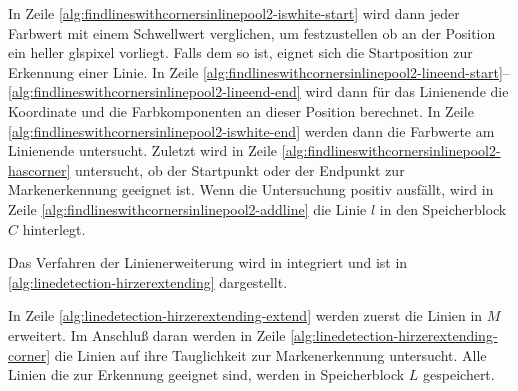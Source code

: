 In Zeile \ref{alg:findlineswithcornersinlinepool2-iswhite-start} wird dann jeder Farbwert mit einem Schwellwert
 verglichen, um festzustellen ob an der Position ein heller gls{pixel} vorliegt. Falls dem so ist, eignet sich die
 Startposition zur Erkennung einer Linie. In Zeile
 \ref{alg:findlineswithcornersinlinepool2-lineend-start}--\ref{alg:findlineswithcornersinlinepool2-lineend-end} wird
 dann für das Linienende die Koordinate und die Farbkomponenten an dieser Position berechnet. In Zeile
 \ref{alg:findlineswithcornersinlinepool2-iswhite-end} werden dann die Farbwerte am Linienende untersucht. Zuletzt wird
 in Zeile \ref{alg:findlineswithcornersinlinepool2-hascorner} untersucht, ob der Startpunkt oder der Endpunkt zur
 Markenerkennung geeignet ist. Wenn die Untersuchung positiv ausfällt, wird in Zeile
 \ref{alg:findlineswithcornersinlinepool2-addline} die Linie $l$ in den Speicherblock $C$ hinterlegt.

Das Verfahren der Linienerweiterung wird in  integriert und ist in
 \autoref{alg:linedetection-hirzerextending} dargestellt.



In Zeile \ref{alg:linedetection-hirzerextending-extend} werden zuerst die Linien in $M$ erweitert. Im Anschluß daran
 werden in Zeile \ref{alg:linedetection-hirzerextending-corner} die Linien auf ihre Tauglichkeit zur Markenerkennung
 untersucht. Alle Linien die zur Erkennung geeignet sind, werden in Speicherblock $L$ gespeichert.
